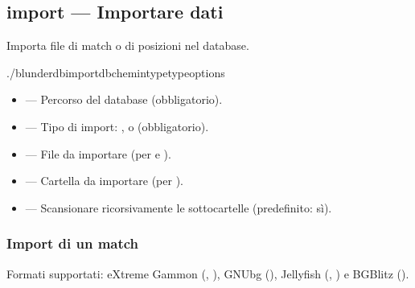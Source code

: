 \documentclass[letterpaper,10pt,italian]{sphinxmanual}
\begin{document}
\subsection{import — Importare dati}
\label{\detokenize{cli:import-importer-des-donnees}}
\sphinxAtStartPar
Importa file di match o di posizioni nel database.

\begin{sphinxVerbatim}[commandchars=\\\{\}]
./blunderdbimport\PYGZhy{}\PYGZhy{}db\PYGZlt{}chemin\PYGZgt{}\PYGZhy{}\PYGZhy{}type\PYGZlt{}type\PYGZgt{}\PYG{o}{[}options\PYG{o}{]}
\end{sphinxVerbatim}

\sphinxAtStartPar
{}
\begin{itemize}
\item {} 
\sphinxAtStartPar
{} — Percorso del database (obbligatorio).

\item {} 
\sphinxAtStartPar
{} — Tipo di import: ,  o  (obbligatorio).

\item {} 
\sphinxAtStartPar
{} — File da importare (per  e ).

\item {} 
\sphinxAtStartPar
{} — Cartella da importare (per ).

\item {} 
\sphinxAtStartPar
{} — Scansionare ricorsivamente le sottocartelle (predefinito: sì).

\end{itemize}


\subsubsection{Import di un match}
\label{\detokenize{cli:import-d-un-match}}
\sphinxAtStartPar
Formati supportati: eXtreme Gammon (, ), GNUbg (), Jellyfish (, ) e BGBlitz ().
\end{document}
